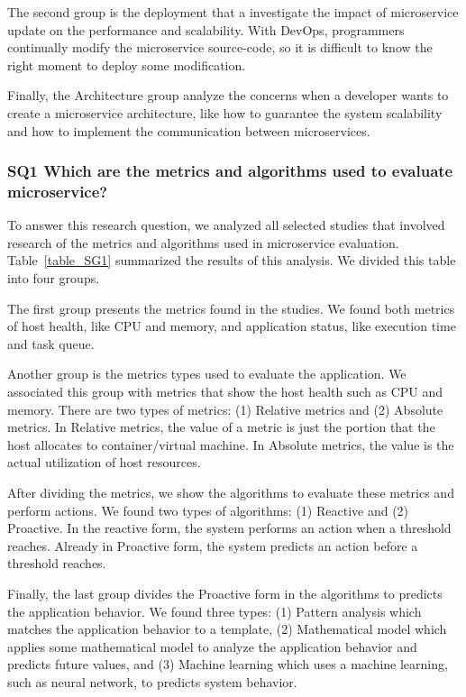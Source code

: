 The second group is the deployment that a investigate the impact of microservice update on the performance and scalability. With DevOps, programmers continually modify the microservice source-code, so it is difficult to know the right moment to deploy some modification.

Finally, the Architecture group analyze the concerns when a developer wants to create a microservice architecture, like how to guarantee the system scalability and how to implement the communication between microservices.

\subsubsection{SQ1 Which are the metrics and algorithms used to evaluate microservice?}

To answer this research question, we analyzed all selected studies that involved research of the metrics and algorithms used in microservice evaluation. Table~\ref{table_SG1} summarized the results of this analysis. We divided this table into four groups.

The first group presents the metrics found in the studies. We found both metrics of host health, like CPU and memory, and application status, like execution time and task queue.

Another group is the metrics types used to evaluate the application. We associated this group with metrics that show the host health such as CPU and memory. There are two types of metrics: (1) Relative metrics and (2) Absolute metrics. In Relative metrics, the value of a metric is just the portion that the host allocates to container/virtual machine. In Absolute metrics, the value is the actual utilization of host resources.

After dividing the metrics, we show the algorithms to evaluate these metrics and perform actions. We found two types of algorithms: (1) Reactive and (2) Proactive. In the reactive form, the system performs an action when a threshold reaches. Already in Proactive form, the system predicts an action before a threshold reaches.

Finally, the last group divides the Proactive form in the algorithms to predicts the application behavior. We found three types: (1) Pattern analysis which matches the application behavior to a template, (2) Mathematical model which applies some mathematical model to analyze the application behavior and predicts future values, and (3) Machine learning which uses a machine learning, such as neural network, to predicts system behavior.


